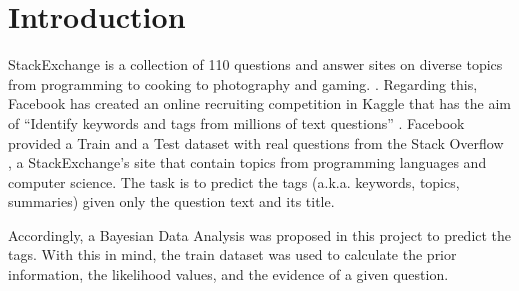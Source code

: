 \section{Introduction} \label{sec:introduction}

StackExchange is a collection of 110 questions and answer sites on diverse topics from programming to cooking to photography and gaming. \citep{stackexchange2013site}.
Regarding this, Facebook \citep{facebook2013site} has created an online recruiting competition in Kaggle \citep{kaggle013site} that has the aim of ``Identify keywords and tags from millions of text questions'' \citep{facebook2013keyword}.
Facebook provided a Train and a Test dataset with real questions from the Stack Overflow \citep{stackoverflow2013site}, a StackExchange's site that contain topics from programming languages and computer science.
The task is to predict the tags (a.k.a. keywords, topics, summaries) given only the question text and its title.

Accordingly, a Bayesian Data Analysis was proposed in this project to predict the tags.
With this in mind, the train dataset was used to calculate the prior information, the likelihood values, and the evidence of a given question.


